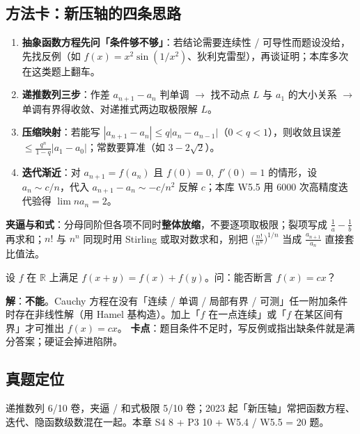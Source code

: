 \documentclass[11pt,a4paper]{ctexart}
\newcommand{\R}{\mathbb{R}}
\newcommand{\abs}[1]{\left\lvert #1\right\rvert}
\begin{document}
\subsection{方法卡：新压轴的四条思路}

\begin{enumerate}
\item \textbf{抽象函数方程先问「条件够不够」}：若结论需要连续性 / 可导性而题设没给，先找反例（如 $f(x)=x^{2}\sin(1/x^{2})$、狄利克雷型），再谈证明；本库多次在这类题上翻车。
\item \textbf{递推数列三步}：作差 $a_{n+1}-a_{n}$ 判单调 $\to$ 找不动点 $L$ 与 $a_1$ 的大小关系 $\to$ 单调有界得收敛、对递推式两边取极限解 $L$。
\item \textbf{压缩映射}：若能写 $\abs{a_{n+1}-a_{n}}\le q\abs{a_{n}-a_{n-1}}$（$0<q<1$），则收敛且误差 $\le\frac{q^{n}}{1-q}\abs{a_1-a_0}$；常数要算准（如 $3-2\sqrt2$）。
\item \textbf{迭代渐近}：对 $a_{n+1}=f(a_n)$ 且 $f(0)=0,\ f'(0)=1$ 的情形，设 $a_n\sim c/n$，代入 $a_{n+1}-a_n\sim -c/n^{2}$ 反解 $c$；本库 W5.5 用 6000 次高精度迭代验得 $\lim n a_n=2$。
\end{enumerate}

\noindent\textbf{夹逼与和式}：分母同阶但各项不同时\textbf{整体放缩}，不要逐项取极限；裂项写成 $\frac1a-\frac1b$ 再求和；$n!$ 与 $n^n$ 同现时用 Stirling 或取对数求和，别把 $\big(\frac{n!}{n^n}\big)^{1/n}$ 当成 $\frac{a_{n+1}}{a_n}$ 直接套比值法。

\begin{keypoint}
设 $f$ 在 $\R$ 上满足 $f(x+y)=f(x)+f(y)$。问：能否断言 $f(x)=cx$？

\noindent\textbf{解}：\textbf{不能}。Cauchy 方程在没有「连续 / 单调 / 局部有界 / 可测」任一附加条件时存在非线性解（用 Hamel 基构造）。加上「$f$ 在一点连续」或「$f$ 在某区间有界」才可推出 $f(x)=cx$。
\textbf{卡点}：题目条件不足时，写反例或指出缺条件就是满分答案；硬证会掉进陷阱。
\end{keypoint}

\subsection{真题定位}
递推数列 6/10 卷，夹逼 / 和式极限 5/10 卷；2023 起「新压轴」常把函数方程、迭代、隐函数级数混在一起。本章 S4 8 + P3 10 + W5.4 / W5.5 = 20 题。
\end{document}
